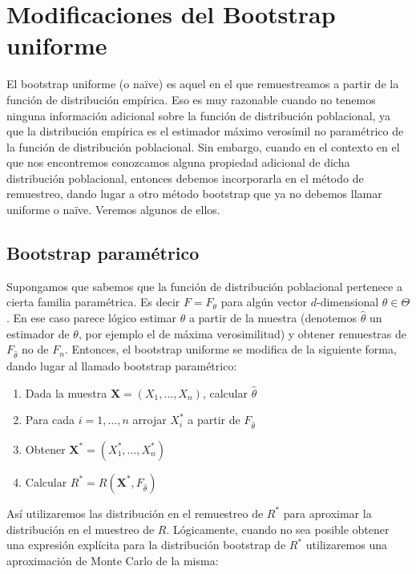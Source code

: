 \documentclass[
]{book}
\renewcommand{\mathbf}[1]{\symbf{#1}}
\theoremstyle{break}
\theoremstyle{nonumberplain}
\begin{document}
\chapter{Modificaciones del Bootstrap uniforme}\label{modunif}

El bootstrap uniforme (o naïve) es aquel en el que remuestreamos a
partir de la función de distribución empírica. Eso es muy razonable
cuando no tenemos ninguna información adicional sobre la función de
distribución poblacional, ya que la distribución empírica es el
estimador máximo verosímil no paramétrico de la función de distribución
poblacional. Sin embargo, cuando en el contexto en el que nos
encontremos conozcamos alguna propiedad adicional de dicha distribución
poblacional, entonces debemos incorporarla en el método de remuestreo,
dando lugar a otro método bootstrap que ya no debemos llamar uniforme o
naïve. Veremos algunos de ellos.

\section{Bootstrap paramétrico}\label{modunif-boot-par}

Supongamos que sabemos que la función de distribución poblacional
pertenece a cierta familia paramétrica. Es decir \(F=F_{\theta }\) para
algún vector \(d\)-dimensional \(\theta \in \Theta\). En ese caso parece
lógico estimar \(\theta\) a partir de la muestra (denotemos
\(\hat{\theta}\) un estimador de \(\theta\), por ejemplo el de máxima
verosimilitud) y obtener remuestras de \(F_{\hat{\theta}}\) no de \(F_n\).
Entonces, el bootstrap uniforme se modifica de la siguiente forma, dando
lugar al llamado bootstrap paramétrico:

\begin{enumerate}
\def\labelenumi{\arabic{enumi}.}
\item
  Dada la muestra
  \(\mathbf{X}=\left( X_1,\ldots ,X_n \right)\), calcular
  \(\hat{\theta}\)
\item
  Para cada \(i=1,\ldots ,n\) arrojar \(X_i^{\ast}\) a partir de
  \(F_{\hat{\theta}}\)
\item
  Obtener \(\mathbf{X}^{\ast}=\left( X_1^{\ast},\ldots
  ,X_n^{\ast} \right)\)
\item
  Calcular \(R^{\ast}=R\left( \mathbf{X}^{\ast},F_{\hat{\theta}} \right)\)
\end{enumerate}

Así utilizaremos las distribución en el remuestreo de \(R^{\ast}\) para
aproximar la distribución en el muestreo de \(R\). Lógicamente, cuando no
sea posible obtener una expresión explícita para la distribución
bootstrap de \(R^{\ast}\) utilizaremos una aproximación de Monte Carlo de
la misma:
\end{document}
